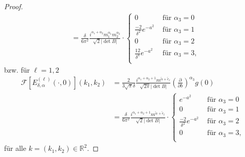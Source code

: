 \documentclass[12pt,a4paper]{scrartcl}
\numberwithin{equation}{section}
\newcommand{\R}{\mathbb{R}} %
\newcommand{\F}{\mathcal{F}} %
\begin{document}
\begin{proof}
\begin{align*}
&=\frac{\delta}{6 \pi^{2}} \frac{i^{\alpha_1 +\alpha_2} m_1^{\alpha_1}m_2^{\alpha_2}}{\sqrt{2} |\det B|} \cdot
\begin{cases}
0 &\text{ für } \alpha_3=0 \\
\frac{-2}{\delta^2}e^{-a^2}  &\text{ für } \alpha_3=1 \\
0 &\text{ für } \alpha_3=2 \\
\frac{12}{\delta^4}e^{-a^2}  &\text{ für } \alpha_3=3, \\
\end{cases}
\end{align*}
bzw. für $\ell=1,2$
\begin{align*}
\F [E_{\delta,\alpha}^{(\ell)}(\cdot,0) ](k_1,k_2) 
&= \frac{2}{3\sqrt{\pi}\delta} \frac{
i^{\alpha_1 +\alpha_2+1} m^{\widetilde \alpha+ \widetilde e_\ell}}{
\sqrt{2\pi} |\det B|}
\left(\frac{\partial}{\partial b}\right)^{\alpha_3} g(0) \\
&=\frac{\delta}{6 \pi^{2}} \frac{
i^{\alpha_1 +\alpha_2+1} m^{\widetilde \alpha+ \widetilde e_\ell}}{
\sqrt{2} |\det B|}
\cdot
\begin{cases}
e^{-a^2} &\text{ für } \alpha_3=0 \\
0  &\text{ für } \alpha_3=1 \\
\frac{-2}{\delta^2}e^{-a^2} &\text{ für } \alpha_3=2 \\
0  &\text{ für } \alpha_3=3, \\
\end{cases}
\end{align*}
für alle $k=(k_1,k_2)\in \R^2$.

\end{proof}
\end{document}
